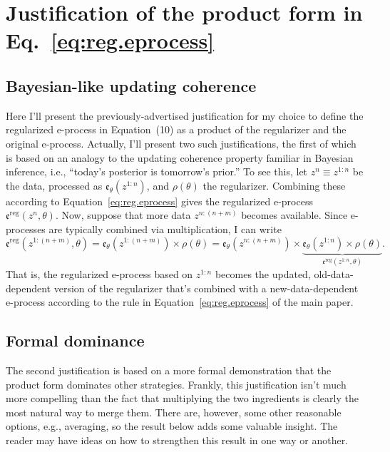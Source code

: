 \documentclass[a4paper, 12pt]{article}
\theoremstyle{plain}
\theoremstyle{definition}
\theoremstyle{remark}
\newcommand{\eval}{\mathfrak{e}}
\begin{document}




\section{Justification of the product form in Eq.~\eqref{eq:reg.eprocess}}
\label{SS:product}

\subsection{Bayesian-like updating coherence}

Here I'll present the previously-advertised justification for my choice to define the regularized e-process in Equation~(10) as a product of the regularizer and the original e-process.  Actually, I'll present two such justifications, the first of which is based on an analogy to the updating coherence property familiar in Bayesian inference, i.e., ``today's posterior is tomorrow's prior.''  To see this, let $z^n \equiv z^{1:n}$ be the data, processed as $\eval_\theta(z^{1:n})$, and $\rho(\theta)$ the regularizer.  Combining these according to Equation~\eqref{eq:reg.eprocess} gives the regularized e-process $\eval^\text{reg}(z^n, \theta)$.  Now, suppose that more data $z^{n:(n+m)}$ becomes available.  Since e-processes are typically combined via multiplication, I can write 
\[ \eval^\text{reg}(z^{1:(n+m)}, \theta) = \eval_\theta(z^{1:(n+m)}) \times \rho(\theta) = \eval_\theta(z^{n:(n+m)}) \times \underbrace{\eval_\theta(z^{1:n}) \times \rho(\theta)}_{\eval^\text{reg}(z^{1:n}, \theta)}. \]
That is, the regularized e-process based on $z^{1:n}$ becomes the updated, old-data-dependent version of the regularizer that's combined with a new-data-dependent e-process according to the rule in  Equation~\eqref{eq:reg.eprocess} of the main paper. 


\subsection{Formal dominance}

The second justification is based on a more formal demonstration that the product form dominates other strategies.  Frankly, this justification isn't much more compelling than the fact that multiplying the two ingredients is clearly the most natural way to merge them.  There are, however, some other reasonable options, e.g., averaging, so the result below adds some valuable insight.  
The reader may have ideas on how to strengthen this result in one way or another.  
\end{document}
